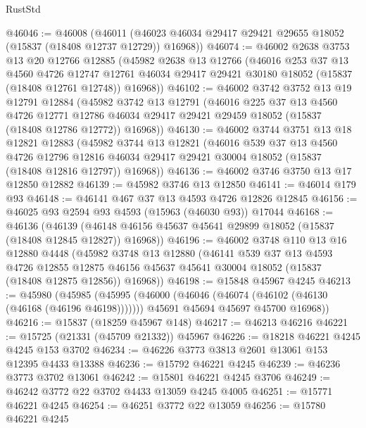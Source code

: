 \begin{lexlean}{RustStd}
\begin{coremodule}
@46046 := @46008
    (@46011 (@46023 @46034 @29417 @29421 @29655 @18052 (@15837 (@18408 @12737 @12729)) @16968))
@46074 := @46002
    @2638
    @3753
    @13
    @20
    @12766
    @12885
    (@45982
      @2638
      @13
      @12766
      (@46016
        @253
        @37
        @13
        @4560
        @4726
        @12747
        @12761
        @46034
        @29417
        @29421
        @30180
        @18052
        (@15837 (@18408 @12761 @12748))
        @16968))
@46102 := @46002
    @3742
    @3752
    @13
    @19
    @12791
    @12884
    (@45982
      @3742
      @13
      @12791
      (@46016
        @225
        @37
        @13
        @4560
        @4726
        @12771
        @12786
        @46034
        @29417
        @29421
        @29459
        @18052
        (@15837 (@18408 @12786 @12772))
        @16968))
@46130 := @46002
    @3744
    @3751
    @13
    @18
    @12821
    @12883
    (@45982
      @3744
      @13
      @12821
      (@46016
        @539
        @37
        @13
        @4560
        @4726
        @12796
        @12816
        @46034
        @29417
        @29421
        @30004
        @18052
        (@15837 (@18408 @12816 @12797))
        @16968))
@46136 := @46002 @3746 @3750 @13 @17 @12850 @12882
@46139 := @45982 @3746 @13 @12850
@46141 := @46014 @179 @93
@46148 := @46141 @467 @37 @13 @4593 @4726 @12826 @12845
@46156 := @46025 @93 @2594 @93 @4593 (@15963 (@46030 @93)) @17044
@46168 := @46136
    (@46139 (@46148 @46156 @45637 @45641 @29899 @18052 (@15837 (@18408 @12845 @12827)) @16968))
@46196 := @46002
    @3748
    @110
    @13
    @16
    @12880
    @4448
    (@45982
      @3748
      @13
      @12880
      (@46141
        @539
        @37
        @13
        @4593
        @4726
        @12855
        @12875
        @46156
        @45637
        @45641
        @30004
        @18052
        (@15837 (@18408 @12875 @12856))
        @16968))
@46198 := @15848 @45967 @4245
@46213 := @45980
    (@45985
      (@45995
        (@46000 (@46046 (@46074 (@46102 (@46130 (@46168 (@46196 @46198)))))))
        @45691
        @45694
        @45697
        @45700
        @16968))
@46216 := @15837 (@18259 @45967 @148)
@46217 := @46213 @46216
@46221 := @15725 (@21331 (@45709 @21332)) @45967
@46226 := @18218 @46221 @4245 @4245 @153 @3702
@46234 := @46226 @3773 @3813 @2601 @13061 @153 @12395 @4433 @13388
@46236 := @15792 @46221 @4245
@46239 := @46236 @3773 @3702 @13061
@46242 := @15801 @46221 @4245 @3706
@46249 := @46242 @3772 @22 @3702 @4433 @13059 @4245 @4005
@46251 := @15771 @46221 @4245
@46254 := @46251 @3772 @22 @13059
@46256 := @15780 @46221 @4245

\end{coremodule}
\end{lexlean}
